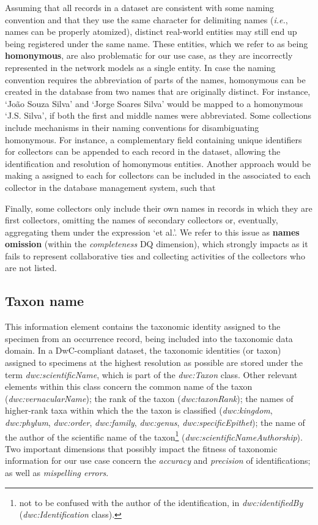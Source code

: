 Assuming that all records in a dataset are consistent with some naming convention and that they use the same character for delimiting names (\textit{i.e.}, names can be properly atomized), distinct real-world entities may still end up being registered under the same name.
These entities, which we refer to as being \textbf{homonymous}, are also problematic for our use case, as they are incorrectly represented in the network models as a single entity.
In case the naming convention requires the abbreviation of parts of the names, homonymous can be created in the database from two names that are originally distinct.
For instance, `João Souza Silva' and `Jorge Soares Silva' would be mapped to a homonymous `J.S. Silva', if both the first and middle names were abbreviated.
%
Some collections include mechanisms in their naming conventions for disambiguating homonymous.
For instance, a complementary field containing unique identifiers for collectors can be appended to each record in the dataset, allowing the identification and resolution of homonymous entities.
Another approach would be making a
assigned to each for collectors can be included in the associated to each collector in the database management system, such that 


Finally, some collectors only include their own names in records in which they are first collectors, omitting the names of secondary collectors or, eventually, aggregating them under the expression `et al.'.
We refer to this issue as \textbf{names omission} (within the \textit{completeness} DQ dimension), which strongly impacts as it fails to represent collaborative ties and collecting activities of the collectors who are not listed.


\subsection{Taxon name}
This information element contains the taxonomic identity assigned to the specimen from an occurrence record, being included into the taxonomic data domain.
In a DwC-compliant dataset, the taxonomic identities (or taxon) assigned to specimens at the highest resolution as possible are stored under the term \textit{dwc:scientificName}, which is part of the \textit{dwc:Taxon} class.
Other relevant elements within this class concern the common name of the taxon (\textit{dwc:vernacularName});
the rank of the taxon (\textit{dwc:taxonRank}); 
the names of higher-rank taxa within which the the taxon is classified (\textit{dwc:kingdom}, \textit{dwc:phylum}, \textit{dwc:order}, \textit{dwc:family}, \textit{dwc:genus}, \textit{dwc:specificEpithet});
the name of the author of the scientific name of the taxon\footnote{not to be confused with the author of the identification, in \textit{dwc:identifiedBy} (\textit{dwc:Identification} class).} (\textit{dwc:scientificNameAuthorship}).
%
Two important dimensions that possibly impact the fitness of taxonomic information for our use case concern the \textit{accuracy} and \textit{precision} of identifications; as well as \textit{mispelling errors}.

